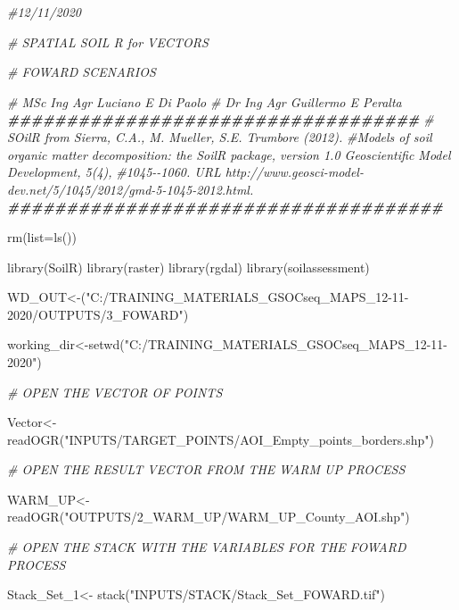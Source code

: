 \documentclass[
  10pt,
  b5paper,
]{book}
\newenvironment{Shaded}{\begin{snugshade}}{\end{snugshade}}
\newcommand{\AttributeTok}[1]{\textcolor[rgb]{0.77,0.63,0.00}{#1}}
\newcommand{\CommentTok}[1]{\textcolor[rgb]{0.56,0.35,0.01}{\textit{#1}}}
\newcommand{\DocumentationTok}[1]{\textcolor[rgb]{0.56,0.35,0.01}{\textbf{\textit{#1}}}}
\newcommand{\FunctionTok}[1]{\textcolor[rgb]{0.00,0.00,0.00}{#1}}
\newcommand{\NormalTok}[1]{#1}
\newcommand{\OtherTok}[1]{\textcolor[rgb]{0.56,0.35,0.01}{#1}}
\newcommand{\StringTok}[1]{\textcolor[rgb]{0.31,0.60,0.02}{#1}}
\begin{document}
\begin{Shaded}
\begin{Highlighting}[]
\CommentTok{\#12/11/2020}

\CommentTok{\# SPATIAL SOIL R  for VECTORS}

\CommentTok{\# FOWARD SCENARIOS}

\CommentTok{\# MSc Ing Agr Luciano E Di Paolo}
\CommentTok{\# Dr Ing Agr Guillermo E Peralta}
\DocumentationTok{\#\#\#\#\#\#\#\#\#\#\#\#\#\#\#\#\#\#\#\#\#\#\#\#\#\#\#\#\#\#\#\#\#\#\#}
\CommentTok{\# SOilR from Sierra, C.A., M. Mueller, S.E. Trumbore (2012). }
\CommentTok{\#Models of soil organic matter decomposition: the SoilR package, version 1.0 Geoscientific Model Development, 5(4), }
\CommentTok{\#1045{-}{-}1060. URL http://www.geosci{-}model{-}dev.net/5/1045/2012/gmd{-}5{-}1045{-}2012.html.}
\DocumentationTok{\#\#\#\#\#\#\#\#\#\#\#\#\#\#\#\#\#\#\#\#\#\#\#\#\#\#\#\#\#\#\#\#\#\#\#\#\#}

\FunctionTok{rm}\NormalTok{(}\AttributeTok{list=}\FunctionTok{ls}\NormalTok{()) }

\FunctionTok{library}\NormalTok{(SoilR)}
\FunctionTok{library}\NormalTok{(raster)}
\FunctionTok{library}\NormalTok{(rgdal)}
\FunctionTok{library}\NormalTok{(soilassessment)}

\NormalTok{WD\_OUT}\OtherTok{\textless{}{-}}\NormalTok{(}\StringTok{"C:/TRAINING\_MATERIALS\_GSOCseq\_MAPS\_12{-}11{-}2020/OUTPUTS/3\_FOWARD"}\NormalTok{)}

\NormalTok{working\_dir}\OtherTok{\textless{}{-}}\FunctionTok{setwd}\NormalTok{(}\StringTok{"C:/TRAINING\_MATERIALS\_GSOCseq\_MAPS\_12{-}11{-}2020"}\NormalTok{)}

\CommentTok{\# OPEN THE VECTOR OF POINTS}

\NormalTok{Vector}\OtherTok{\textless{}{-}}\FunctionTok{readOGR}\NormalTok{(}\StringTok{"INPUTS/TARGET\_POINTS/AOI\_Empty\_points\_borders.shp"}\NormalTok{)}

\CommentTok{\# OPEN THE RESULT VECTOR FROM THE WARM UP PROCESS}

\NormalTok{WARM\_UP}\OtherTok{\textless{}{-}}\FunctionTok{readOGR}\NormalTok{(}\StringTok{"OUTPUTS/2\_WARM\_UP/WARM\_UP\_County\_AOI.shp"}\NormalTok{)}

\CommentTok{\# OPEN THE STACK WITH THE VARIABLES FOR THE FOWARD PROCESS}

\NormalTok{Stack\_Set\_1}\OtherTok{\textless{}{-}} \FunctionTok{stack}\NormalTok{(}\StringTok{"INPUTS/STACK/Stack\_Set\_FOWARD.tif"}\NormalTok{)}


\end{Highlighting}
\end{Shaded}
\end{document}
